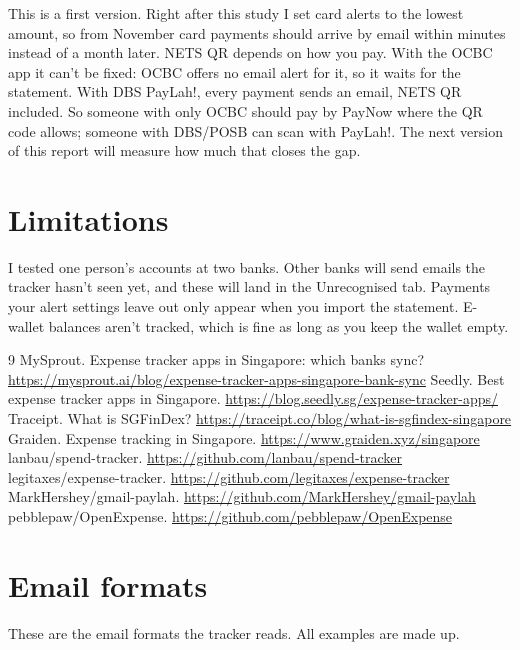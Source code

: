 \documentclass[10pt]{article}
\begin{document}
This is a first version. Right after this study I set card alerts to the lowest amount, so from November card payments should arrive by email within minutes instead of a month later. NETS QR depends on how you pay. With the OCBC app it can't be fixed: OCBC offers no email alert for it, so it waits for the statement. With DBS PayLah!, every payment sends an email, NETS QR included. So someone with only OCBC should pay by PayNow where the QR code allows; someone with DBS/POSB can scan with PayLah!. The next version of this report will measure how much that closes the gap.

\section{Limitations}

I tested one person's accounts at two banks. Other banks will send emails the tracker hasn't seen yet, and these will land in the Unrecognised tab. Payments your alert settings leave out only appear when you import the statement. E-wallet balances aren't tracked, which is fine as long as you keep the wallet empty.

\begin{thebibliography}{9}\small
{} MySprout. Expense tracker apps in Singapore: which banks sync? \url{https://mysprout.ai/blog/expense-tracker-apps-singapore-bank-sync}
 Seedly. Best expense tracker apps in Singapore. \url{https://blog.seedly.sg/expense-tracker-apps/}
 Traceipt. What is SGFinDex? \url{https://traceipt.co/blog/what-is-sgfindex-singapore}
 Graiden. Expense tracking in Singapore. \url{https://www.graiden.xyz/singapore}
 lanbau/spend-tracker. \url{https://github.com/lanbau/spend-tracker}
 legitaxes/expense-tracker. \url{https://github.com/legitaxes/expense-tracker}
 MarkHershey/gmail-paylah. \url{https://github.com/MarkHershey/gmail-paylah}
 pebblepaw/OpenExpense. \url{https://github.com/pebblepaw/OpenExpense}
\end{thebibliography}

\clearpage
\appendix

\section{Email formats}

These are the email formats the tracker reads. All examples are made up.
\end{document}
